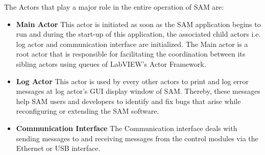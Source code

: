 The Actors that play a major role in the entire operation of SAM are:
\begin{itemize}[label={}]
\item \textbf{Main Actor} This actor is initiated as soon as the SAM application begins to run and during the start-up of this application, the associated child actors i.e. log actor and communication interface are initialized. 
The Main actor is a root actor that is responsible for facilitating the coordination between its sibling actors using queues of LabVIEW's Actor Framework.  

\item \textbf{Log Actor} This actor is used by every other actors to print and log error messages at log actor's \gls{GUI} display window of SAM. 
Thereby, these messages help SAM users and developers to identify and fix bugs that arise while reconfiguring or extending the SAM software.    

\item \textbf{Communication Interface} The Communication interface deals with sending messages to and receiving messages from the control modules via the Ethernet or \acrshort{USB} interface.
 

\end{itemize}
